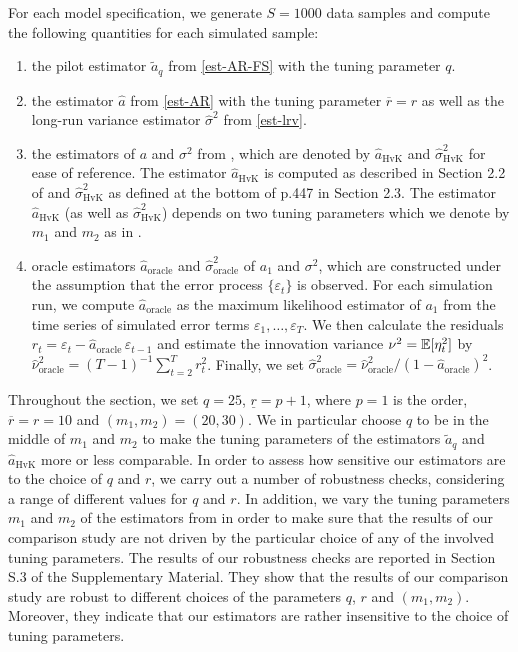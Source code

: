 For each model specification, we generate $S=1000$ data samples and compute the following quantities for each simulated sample: 
\begin{enumerate}[label=(\roman*),leftmargin=0.9cm]
\item the pilot estimator $\widetilde{a}_q$ from \eqref{est-AR-FS} with the tuning parameter $q$.
\item the estimator $\widehat{a}$ from \eqref{est-AR} with the tuning parameter $\overline{r} = r$ as well as the long-run variance estimator $\widehat{\sigma}^2$ from \eqref{est-lrv}. 
\item the estimators of $a$ and $\sigma^2$ from \cite{Hall2003}, which are denoted by $\widehat{a}_{\text{HvK}}$ and $\widehat{\sigma}^2_{\text{HvK}}$ for ease of reference. The estimator $\widehat{a}_{\text{HvK}}$ is computed as described in Section 2.2 of \cite{Hall2003} and $\widehat{\sigma}^2_{\text{HvK}}$ as defined at the bottom of p.447 in Section 2.3. The estimator $\widehat{a}_{\text{HvK}}$ (as well as $\widehat{\sigma}^2_{\text{HvK}}$) depends on two tuning parameters which we denote by $m_1$ and $m_2$ as in \cite{Hall2003}. 
\item oracle estimators $\widehat{a}_{\text{oracle}}$ and $\widehat{\sigma}^2_{\text{oracle}}$ of $a_1$ and $\sigma^2$, which are constructed under the assumption that the error process $\{\varepsilon_t\}$ is observed. For each simulation run, we compute $\widehat{a}_{\text{oracle}}$ as the maximum likelihood estimator of $a_1$ from the time series of simulated error terms $\varepsilon_1,\ldots,\varepsilon_T$. We then calculate the residuals $r_t = \varepsilon_t - \widehat{a}_{\text{oracle}} \, \varepsilon_{t-1}$ and estimate the innovation variance $\nu^2 = \mathbb{E}[\eta_t^2]$ by $\widehat{\nu}_{\text{oracle}}^2 = (T-1)^{-1} \sum_{t=2}^T r_t^2$. Finally, we set $\widehat{\sigma}^2_{\text{oracle}} = \widehat{\nu}_{\text{oracle}}^2 / (1 - \widehat{a}_{\text{oracle}})^2$. 
\end{enumerate}
Throughout the section, we set $q = 25$, $\underline{r} = p + 1$, where $p = 1$ is the order, $\overline{r} = r = 10$ and $(m_1,m_2) = (20,30)$. We in particular choose $q$ to be in the middle of $m_1$ and $m_2$ to make the tuning parameters of the estimators $\widetilde{a}_q$ and $\widehat{a}_{\text{HvK}}$ more or less comparable. In order to assess how sensitive our estimators are to the choice of $q$ and $r$, we carry out a number of robustness checks, considering a range of different values for $q$ and $r$. In addition, we vary the tuning parameters $m_1$ and $m_2$ of the estimators from \cite{Hall2003} in order to make sure that the results of our comparison study are not driven by the particular choice of any of the involved tuning parameters. The results of our robustness checks are reported in Section S.3 of the Supplementary Material. They show that the results of our comparison study are robust to %
different choices of the parameters $q$, $r$ and $(m_1,m_2)$. Moreover, they indicate that our estimators are rather insensitive to the choice of tuning parameters. 


